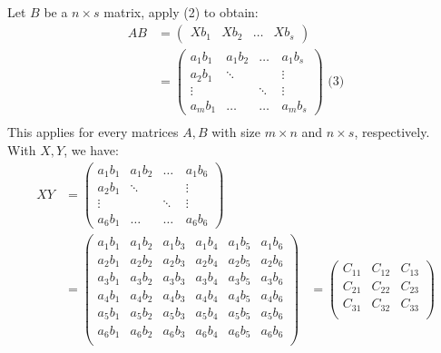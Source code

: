     Let $B$ be a $n \times s$ matrix, apply (2) to obtain:
    \begin{align*}
      AB &= \begin{pmatrix}
        Xb_1 & Xb_2 & \dots & Xb_s
      \end{pmatrix} \\
      &= \begin{pmatrix}
        a_1 b_1 & a_1 b_2 & \dots & a_1 b_s \\
        a_2 b_1 & \ddots & \quad & \vdots \\
        \vdots & \quad & \ddots & \vdots  \\
        a_m b_1 & \dots & \dots & a_m b_s
      \end{pmatrix} \text{ (3)} \\
    \end{align*}
    This applies for every matrices $A, B$ with size $m \times n$ and $n \times s$, respectively. \\
    With $X, Y$, we have:
    \begin{align*}
      XY  
      &= \begin{pmatrix}
        a_1 b_1 & a_1 b_2 & \dots & a_1 b_6 \\
        a_2 b_1 & \ddots & \quad & \vdots \\
        \vdots & \quad & \ddots & \vdots  \\
        a_6 b_1 & \dots & \dots & a_6 b_6
      \end{pmatrix} \\
      &= \left(\begin{array}{cc|cc|cc}
        a_1 b_1 & a_1 b_2 & a_1 b_3 & a_1 b_4 & a_1 b_5 & a_1 b_6 \\
        a_2 b_1 & a_2 b_2 & a_2 b_3 & a_2 b_4 & a_2 b_5 & a_2 b_6 \\
        \hline
        a_3 b_1 & a_3 b_2 & a_3 b_3 & a_3 b_4 & a_3 b_5 & a_3 b_6 \\
        a_4 b_1 & a_4 b_2 & a_4 b_3 & a_4 b_4 & a_4 b_5 & a_4 b_6 \\
        \hline
        a_5 b_1 & a_5 b_2 & a_5 b_3 & a_5 b_4 & a_5 b_5 & a_5 b_6 \\
        a_6 b_1 & a_6 b_2 & a_6 b_3 & a_6 b_4 & a_6 b_5 & a_6 b_6 \\
      \end{array}
    \right)
      &= \begin{pmatrix}
        C_{11} & C_{12} & C_{13} \\
        C_{21} & C_{22} & C_{23} \\
        C_{31} & C_{32} & C_{33} \\
      \end{pmatrix}
    \end{align*}
